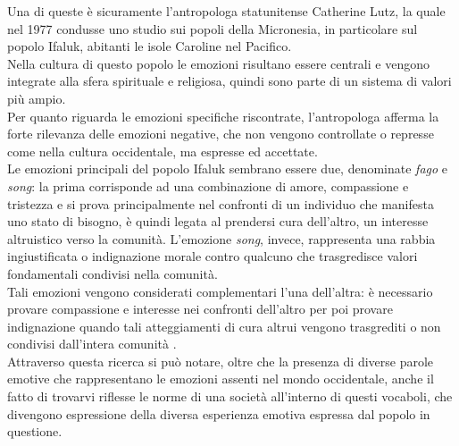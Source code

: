 Una di queste è sicuramente l'antropologa statunitense Catherine Lutz, la quale nel 1977 condusse uno studio sui popoli della Micronesia, in particolare sul popolo Ifaluk, abitanti le isole Caroline nel Pacifico. \\
Nella cultura di questo popolo le emozioni risultano essere centrali e vengono integrate alla sfera spirituale e religiosa, quindi sono parte di un sistema di valori più ampio. \\
Per quanto riguarda le emozioni specifiche riscontrate, l'antropologa afferma la forte rilevanza delle emozioni negative, che non vengono controllate o represse come nella cultura occidentale, ma espresse ed accettate. \\
Le emozioni principali del popolo Ifaluk sembrano essere due, denominate \textit{fago} e \textit{song}: la prima corrisponde ad una combinazione di amore, compassione e tristezza e si prova principalmente nel confronti di un individuo che manifesta uno stato di bisogno, è quindi legata al prendersi cura dell'altro, un interesse altruistico verso la comunità. L'emozione \textit{song}, invece, rappresenta una rabbia ingiustificata o indignazione morale contro qualcuno che trasgredisce valori fondamentali condivisi nella comunità. \\
Tali emozioni vengono considerati complementari l'una dell'altra: è necessario provare compassione e interesse nei confronti dell'altro per poi provare indignazione quando tali atteggiamenti di cura altrui vengono trasgrediti o non condivisi dall’intera comunità \parencite{lutz_micronesia}. \\
Attraverso questa ricerca si può notare, oltre che la presenza di diverse parole emotive che rappresentano le emozioni assenti nel mondo occidentale, anche il fatto di trovarvi riflesse le norme di una società all'interno di questi vocaboli, che divengono espressione della diversa esperienza emotiva espressa dal popolo in questione. 

